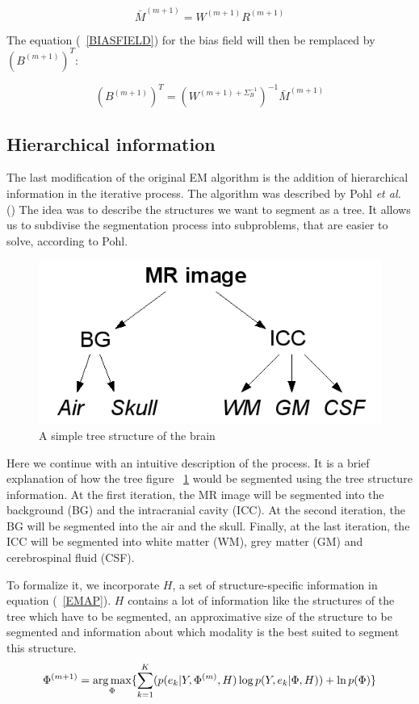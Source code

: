   \begin{equation*}
  \bar{M}^{(m+1)} = W^{(m+1)}R^{(m+1)}
  \end{equation*}

The equation (~\ref{BIASFIELD}) for the bias field will then be remplaced by $(B^{(m+1)})^T$:

  \begin{equation*}
  (B^{(m+1)})^T = (W^{(m+1) + \Sigma_B^{-1}})^{-1}\bar{M}^{(m+1)}
  \end{equation*}

%
\subsection{Hierarchical information}\label{Structure}
The last modification of the original EM algorithm is the addition of hierarchical information in the iterative process. The algorithm was described by Pohl \textit{et al.} (\cite{11}) The idea was to describe the structures we want to segment as a tree. It allows us to subdivise the segmentation process into subproblems, that are easier to solve, according to Pohl.
  
  \begin{figure}[ht]\centering
  \includegraphics[width=.5\textwidth]{Images/Graphics/treeStructure.png}
  \caption{A simple tree structure of the brain}\label{fig:treeStructure}
  \end{figure}
  
Here we continue with an intuitive description of the process. It is a brief explanation of how the tree figure ~\ref{fig:treeStructure} would be segmented using the tree structure information. At the first iteration, the MR image will be segmented into the background (BG) and the intracranial cavity (ICC). At the second iteration, the BG will be segmented into the air and the skull. Finally, at the last iteration, the ICC will be segmented into white matter (WM), grey matter (GM) and cerebrospinal fluid (CSF).

To formalize it, we incorporate $H$, a set of structure-specific information in equation (~\ref{EMAP}). $H$ contains a lot of information like the structures of the tree which have to be segmented, an approximative size of the structure to be segmented and information about which modality is the best suited to segment this structure.
\begin{equation*}
 \Phi^{(m+1)}=\operatorname*{arg\,max}_\Phi \{\sum_{k=1}^K   (p(e_{k}|Y,\Phi^{(m)},H)\operatorname*{log} p(Y,e_{k}|\Phi,H)) + \operatorname*{ln} p(\Phi) \} \\
\end{equation*}
 
